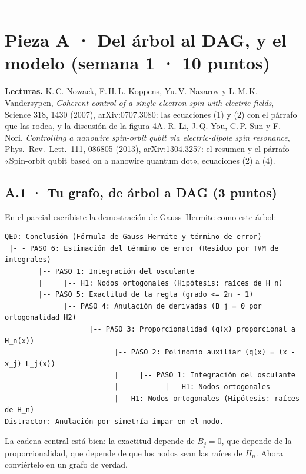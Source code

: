 \begin{center}\rule{0.5\linewidth}{0.5pt}\end{center}

\section{Pieza A · Del árbol al DAG, y el modelo (semana 1 · 10 puntos)}

\textbf{Lecturas.} K.\,C. Nowack, F.\,H.\,L. Koppens, Yu.\,V. Nazarov y L.\,M.\,K. Vandersypen, \emph{Coherent control of a single electron spin with electric fields}, Science 318, 1430 (2007), arXiv:0707.3080: las ecuaciones (1) y (2) con el párrafo que las rodea, y la discusión de la figura 4A. R. Li, J.\,Q. You, C.\,P. Sun y F. Nori, \emph{Controlling a nanowire spin-orbit qubit via electric-dipole spin resonance}, Phys.\ Rev.\ Lett.\ 111, 086805 (2013), arXiv:1304.3257: el resumen y el párrafo «Spin-orbit qubit based on a nanowire quantum dot», ecuaciones (2) a (4).

\subsection{A.1 · Tu grafo, de árbol a DAG (3 puntos)}

En el parcial escribiste la demostración de Gauss--Hermite como este árbol:

\begin{Verbatim}[fontsize=\footnotesize, frame=single]
QED: Conclusión (Fórmula de Gauss-Hermite y término de error)
 |- - PASO 6: Estimación del término de error (Residuo por TVM de integrales)
        |-- PASO 1: Integración del osculante
        |     |-- H1: Nodos ortogonales (Hipótesis: raíces de H_n)
        |-- PASO 5: Exactitud de la regla (grado <= 2n - 1)
              |-- PASO 4: Anulación de derivadas (B_j = 0 por ortogonalidad H2)
                    |-- PASO 3: Proporcionalidad (q(x) proporcional a H_n(x))
                          |-- PASO 2: Polinomio auxiliar (q(x) = (x - x_j) L_j(x))
                          |     |-- PASO 1: Integración del osculante
                          |           |-- H1: Nodos ortogonales
                          |-- H1: Nodos ortogonales (Hipótesis: raíces de H_n)
Distractor: Anulación por simetría impar en el nodo.
\end{Verbatim}

La cadena central está bien: la exactitud depende de $B_j = 0$, que depende de la proporcionalidad, que depende de que los nodos sean las raíces de $H_n$. Ahora conviértelo en un grafo de verdad.

